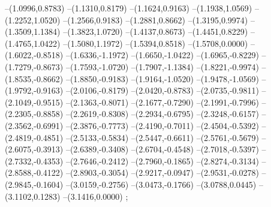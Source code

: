 {--(1.0996,0.8783)
--(1.1310,0.8179)
--(1.1624,0.9163)
--(1.1938,1.0569)
--(1.2252,1.0520)
--(1.2566,0.9183)
--(1.2881,0.8662)
--(1.3195,0.9974)
--(1.3509,1.1384)
--(1.3823,1.0720)
--(1.4137,0.8673)
--(1.4451,0.8229)
--(1.4765,1.0422)
--(1.5080,1.1972)
--(1.5394,0.8518)
--(1.5708,0.0000)
--(1.6022,-0.8518)
--(1.6336,-1.1972)
--(1.6650,-1.0422)
--(1.6965,-0.8229)
--(1.7279,-0.8673)
--(1.7593,-1.0720)
--(1.7907,-1.1384)
--(1.8221,-0.9974)
--(1.8535,-0.8662)
--(1.8850,-0.9183)
--(1.9164,-1.0520)
--(1.9478,-1.0569)
--(1.9792,-0.9163)
--(2.0106,-0.8179)
--(2.0420,-0.8783)
--(2.0735,-0.9811)
--(2.1049,-0.9515)
--(2.1363,-0.8071)
--(2.1677,-0.7290)
--(2.1991,-0.7996)
--(2.2305,-0.8858)
--(2.2619,-0.8308)
--(2.2934,-0.6795)
--(2.3248,-0.6157)
--(2.3562,-0.6991)
--(2.3876,-0.7773)
--(2.4190,-0.7011)
--(2.4504,-0.5392)
--(2.4819,-0.4851)
--(2.5133,-0.5834)
--(2.5447,-0.6611)
--(2.5761,-0.5679)
--(2.6075,-0.3913)
--(2.6389,-0.3408)
--(2.6704,-0.4548)
--(2.7018,-0.5397)
--(2.7332,-0.4353)
--(2.7646,-0.2412)
--(2.7960,-0.1865)
--(2.8274,-0.3134)
--(2.8588,-0.4122)
--(2.8903,-0.3054)
--(2.9217,-0.0947)
--(2.9531,-0.0278)
--(2.9845,-0.1604)
--(3.0159,-0.2756)
--(3.0473,-0.1766)
--(3.0788,0.0445)
--(3.1102,0.1283)
--(3.1416,0.0000)
;}
